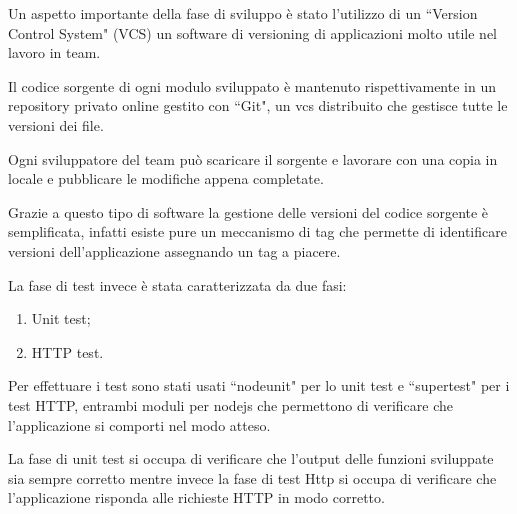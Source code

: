 Un aspetto importante della fase di sviluppo è stato l'utilizzo di un ``Version Control System" (VCS) un software di versioning di applicazioni molto utile nel lavoro in team. 

Il codice sorgente di ogni modulo sviluppato è mantenuto rispettivamente in un repository privato online gestito con ``Git", un vcs distribuito che gestisce tutte le versioni dei file. 

Ogni sviluppatore del team può scaricare il sorgente e lavorare con una copia in locale e pubblicare le modifiche appena completate. 

Grazie a questo tipo di software la gestione delle versioni del codice sorgente è semplificata, infatti esiste pure un meccanismo di tag che permette di identificare versioni dell'applicazione assegnando un tag a piacere.
\newline

La fase di test invece è stata caratterizzata da due fasi:
\begin{enumerate}
	\item Unit test;
	\item HTTP test.
\end{enumerate}

Per effettuare i test sono stati usati ``nodeunit" per lo unit test e ``supertest" per i test HTTP, entrambi moduli per nodejs che permettono di verificare che l'applicazione si comporti nel modo atteso. 

La fase di unit test si occupa di verificare che l'output delle funzioni sviluppate sia sempre corretto mentre invece la fase di test Http si occupa di verificare che l'applicazione risponda alle richieste HTTP in modo corretto.